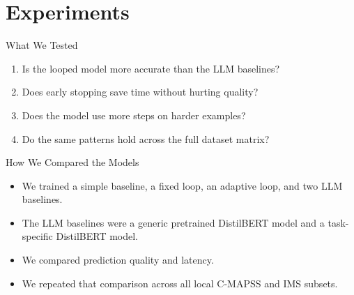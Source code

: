 \section{Experiments}

\begin{frame}{What We Tested}
  \begin{enumerate}
    \item Is the looped model more accurate than the LLM baselines?
    \item Does early stopping save time without hurting quality?
    \item Does the model use more steps on harder examples?
    \item Do the same patterns hold across the full dataset matrix?
  \end{enumerate}
\end{frame}

\begin{frame}{How We Compared the Models}
  \begin{itemize}
    \item We trained a simple baseline, a fixed loop, an adaptive loop, and two LLM baselines.
    \item The LLM baselines were a generic pretrained DistilBERT model and a task-specific DistilBERT model.
    \item We compared prediction quality and latency.
    \item We repeated that comparison across all local C-MAPSS and IMS subsets.
  \end{itemize}
\end{frame}
